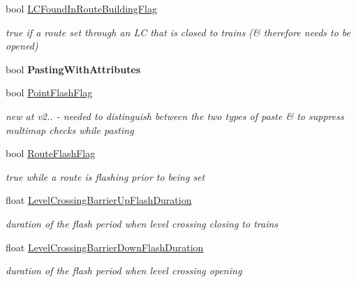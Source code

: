 \begin{DoxyCompactItemize}
\mbox{\label{class_t_track_a3be055d3c016ced93635700d7da9a2da}} 
bool \mbox{\hyperlink{class_t_track_a3be055d3c016ced93635700d7da9a2da}{L\+C\+Found\+In\+Route\+Building\+Flag}}
\begin{DoxyCompactList}\small\item\em true if a route set through an LC that is closed to trains (\& therefore needs to be opened) \end{DoxyCompactList}\item 
\mbox{\label{class_t_track_ac1051330dac60335da74eb2c265cd40c}} 
bool {\bfseries Pasting\+With\+Attributes}
\item 
bool \mbox{\hyperlink{class_t_track_a50f518fa93ef56b1570e4102fb691e14}{Point\+Flash\+Flag}}
\begin{DoxyCompactList}\small\item\em new at v2.. -\/ needed to distinguish between the two types of paste \& to suppress multimap checks while pasting \end{DoxyCompactList}\item 
\mbox{\label{class_t_track_aa66417417a7767acb35425dfa4754311}} 
bool \mbox{\hyperlink{class_t_track_aa66417417a7767acb35425dfa4754311}{Route\+Flash\+Flag}}
\begin{DoxyCompactList}\small\item\em true while a route is flashing prior to being set \end{DoxyCompactList}\item 
\mbox{\label{class_t_track_a33051ac63ce31022cba42eec28611ca0}} 
float \mbox{\hyperlink{class_t_track_a33051ac63ce31022cba42eec28611ca0}{Level\+Crossing\+Barrier\+Up\+Flash\+Duration}}
\begin{DoxyCompactList}\small\item\em duration of the flash period when level crossing closing to trains \end{DoxyCompactList}\item 
\mbox{\label{class_t_track_a6edc256a0cefda4c7a51c79004b83597}} 
float \mbox{\hyperlink{class_t_track_a6edc256a0cefda4c7a51c79004b83597}{Level\+Crossing\+Barrier\+Down\+Flash\+Duration}}
\begin{DoxyCompactList}\small\item\em duration of the flash period when level crossing opening \end{DoxyCompactList}\item 

\end{DoxyCompactItemize}
